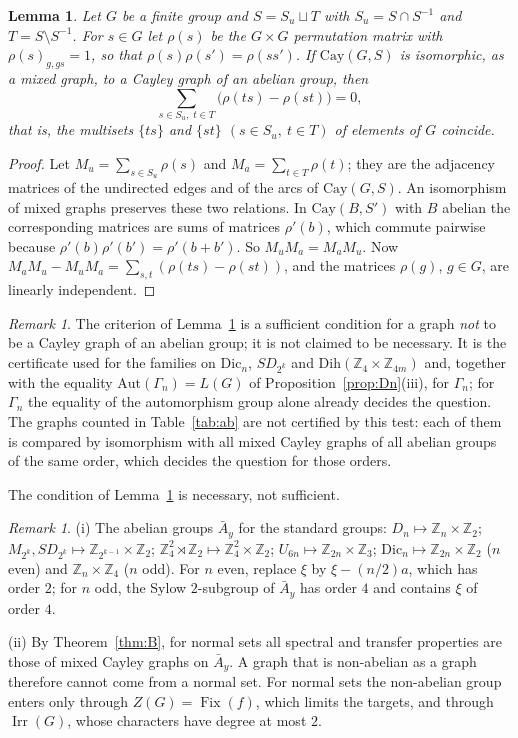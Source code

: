 \documentclass[preprint,11pt]{elsarticle}
\newtheorem{lemma}[theorem]{Lemma}
\theoremstyle{definition}
\theoremstyle{remark}
\newtheorem{remark}[theorem]{Remark}
\DeclareMathOperator{\Fix}{Fix}
\DeclareMathOperator{\Irr}{Irr}
\newcommand{\Z}{\mathbb Z}
\begin{document}
\begin{lemma}\label{lem:abtest}
Let $G$ be a finite group and $S=S_u\sqcup T$ with $S_u=S\cap S^{-1}$ and $T=S\setminus S^{-1}$. For $s\in G$ let $\rho(s)$ be the $G\times G$ permutation matrix with $\rho(s)_{g,gs}=1$, so that $\rho(s)\rho(s')=\rho(ss')$. If $\mathrm{Cay}(G,S)$ is isomorphic, as a mixed graph, to a Cayley graph of an abelian group, then
\[
\sum_{s\in S_u,\;t\in T}\bigl(\rho(ts)-\rho(st)\bigr)=0,
\]
that is, the multisets $\{ts\}$ and $\{st\}$ $(s\in S_u,\ t\in T)$ of elements of $G$ coincide.
\end{lemma}
\begin{proof}
Let $M_u=\sum_{s\in S_u}\rho(s)$ and $M_a=\sum_{t\in T}\rho(t)$; they are the adjacency matrices of the undirected edges and of the arcs of $\mathrm{Cay}(G,S)$. An isomorphism of mixed graphs preserves these two relations. In $\mathrm{Cay}(B,S')$ with $B$ abelian the corresponding matrices are sums of matrices $\rho'(b)$, which commute pairwise because $\rho'(b)\rho'(b')=\rho'(b+b')$. So $M_uM_a=M_aM_u$. Now $M_aM_u-M_uM_a=\sum_{s,t}(\rho(ts)-\rho(st))$, and the matrices $\rho(g)$, $g\in G$, are linearly independent.
\end{proof}
\begin{remark}
The criterion of Lemma~\ref{lem:abtest} is a sufficient condition for a graph \emph{not} to be a Cayley graph of an abelian group; it is not claimed to be necessary. It is the certificate used for the families on $\mathrm{Dic}_n$, $SD_{2^k}$ and $\mathrm{Dih}(\Z_4\times\Z_{4m})$ and, together with the equality $\mathrm{Aut}(\Gamma_n)=L(G)$ of Proposition~\ref{prop:Dn}(iii), for $\Gamma_n$; for $\Gamma_n$ the equality of the automorphism group alone already decides the question. The graphs counted in Table~\ref{tab:ab} are not certified by this test: each of them is compared by isomorphism with all mixed Cayley graphs of all abelian groups of the same order, which decides the question for those orders.
\end{remark}

The condition of Lemma~\ref{lem:abtest} is necessary, not sufficient.

\begin{remark}\label{rem:Abar}
(i) The abelian groups $\bar A_y$ for the standard groups: $D_n\mapsto\Z_n\times\Z_2$; $M_{2^k},SD_{2^k}\mapsto\Z_{2^{k-1}}\times\Z_2$; $\Z_4^2\rtimes\Z_2\mapsto\Z_4^2\times\Z_2$; $U_{6n}\mapsto\Z_{2n}\times\Z_3$; $\mathrm{Dic}_n\mapsto\Z_{2n}\times\Z_2$ ($n$ even) and $\Z_n\times\Z_4$ ($n$ odd). For $n$ even, replace $\xi$ by $\xi-(n/2)a$, which has order $2$; for $n$ odd, the Sylow $2$-subgroup of $\bar A_y$ has order $4$ and contains $\xi$ of order $4$.

(ii) By Theorem~\ref{thm:B}, for normal sets all spectral and transfer properties are those of mixed Cayley graphs on $\bar A_y$. A graph that is non-abelian as a graph therefore cannot come from a normal set. For normal sets the non-abelian group enters only through $Z(G)=\Fix(f)$, which limits the targets, and through $\Irr(G)$, whose characters have degree at most $2$.
\end{remark}
\end{document}
